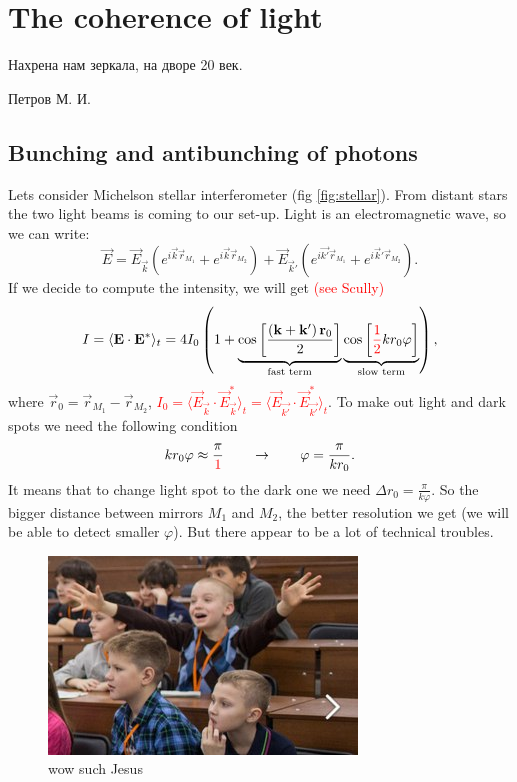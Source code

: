 \section{The coherence of light}

\epigraph{Нахрена нам зеркала, на дворе 20 век.}{Петров М. И.}

\subsection{Bunching and antibunching of photons}

Lets consider Michelson stellar interferometer (fig \ref{fig:stellar}). From distant stars the two light beams is coming to our set-up. Light is an electromagnetic wave, so we can write:
\begin{equation}
	\vec{E} = \vec{E}_{\vec{k}} \left( e^{i \vec{k} \vec{r}_{M_1}}  + e^{i \vec{k} \vec{r}_{M_2}} \right) + \vec{E}_{\vec{k}'} \left( e^{i \vec{k'} \vec{r}_{M_1}} + e^{i \vec{k}' \vec{r}_{M_2}} \right).
\end{equation}
If we decide to compute the intensity, we will get { \textcolor{red} {(see Scully)}}
\begin{equation}
	I = \langle \mathbf{E} \cdot \mathbf{E}^* \rangle_t  = 4 I_0 \left( 1 + \underbrace{\cos \left[\frac{\left( \mathbf{k} + \mathbf{k}' \right) \mathbf{r}_0}{2}\right]}_{\text{fast term}} \underbrace{\cos \left[{\textcolor{red}{\frac{1}{2}}}  k r_0 \varphi \right]}_{\text{slow term}} \right),
\end{equation}
where $\vec{r}_0 = \vec{r}_{M_1} - \vec{r}_{M_2}$, {\textcolor{red}{$I_0=\langle \vec{E}_{\vec{k}} \cdot \vec{E}_{\vec{k}}^* \rangle_t=\langle \vec{E}_{\vec{k'}} \cdot \vec{E}_{\vec{k'}}^* \rangle_t$}}. To make out light and dark spots we need the following condition
\begin{equation}
	k r_0 \varphi \approx \frac{\pi}{{\textcolor{red} 1}} \qquad \to \qquad \varphi = \frac{\pi}{k r_0}.
\end{equation}
It means that to change light spot to the dark one  we need $\Delta r_0 = \frac{\pi}{k \varphi}$. So the bigger distance between mirrors $M_1$ and $M_2$, the better resolution we get (we will be able to detect smaller $\varphi$). But there appear to be a lot of technical troubles.
\begin{figure}
	\centering
	\includegraphics[width=0.5\linewidth]{fig/L3/Ij8NUO6Gat0}
	\caption{wow such Jesus}
	\label{fig:jesus}
\end{figure}

